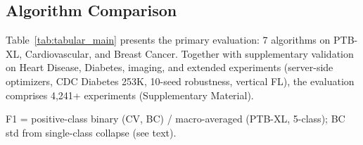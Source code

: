 \documentclass[conference,letterpaper]{IEEEtran}
\begin{document}
\subsection{Algorithm Comparison}

Table~\ref{tab:tabular_main} presents the primary evaluation: 7 algorithms on PTB-XL, Cardiovascular, and Breast Cancer. Together with supplementary validation on Heart Disease, Diabetes, imaging, and extended experiments (server-side optimizers, CDC Diabetes 253K, 10-seed robustness, vertical FL), the evaluation comprises 4,241+ experiments (Supplementary Material).

\begin{table}[htbp]
\centering
\caption{FL Algorithm Comparison on Real Clinical Datasets (7 Algorithms $\times$ 3 Datasets). Best accuracy per dataset in \textbf{bold}. Mean $\pm$ std over 5 seeds. PX = PTB-XL ECG (5 clients, 5-class, site-based), CV = Cardiovascular (5 clients, binary, $\alpha$=0.5), BC = Breast Cancer (3 clients, binary, $\alpha$=0.5).}
\label{tab:tabular_main}
\par{\footnotesize F1 = positive-class binary (CV, BC) / macro-averaged (PTB-XL, 5-class); BC std from single-class collapse (see text).}
\end{table}
\end{document}
